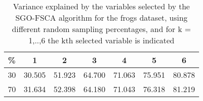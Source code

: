 \begin{table}
	\begin{center}
		\begin{tabular}{c c c c c c c}
			\% & 1 & 2 & 3 & 4 & 5 & 6 \\
			\hline
			30 & 30.505 & 51.923 & 64.700 & 71.063 & 75.951 & 80.878 \\
			70 & 31.634 & 52.398 & 64.180 & 71.043 & 76.318 & 81.219 \\
		\end{tabular}
	\end{center}
	\caption{Variance explained by the variables selected by the SGO-FSCA algorithm for the frogs dataset, using different random sampling percentages, and for k = 1,..,6 the kth selected variable is indicated}
\end{table}